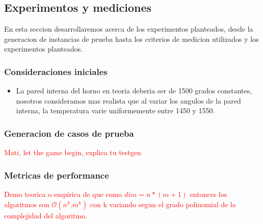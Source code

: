 \subsection{Experimentos y mediciones}
En esta seccion desarrollaremos acerca de los experimentos planteados, desde la generacion de instancias de prueba hasta los criterios de medicion utilizados y los experimentos planteados.
\subsubsection{Consideraciones iniciales}
\begin{itemize}
    \item La pared interna del horno en teoria deberia ser de 1500 grados constantes, nosotros consideramos mas realista que al variar los angulos de la pared interna, la temperatura varie uniformemente entre 1450 y 1550.
\end{itemize}

\subsubsection{Generacion de casos de prueba}
\textcolor{red}{Mati, let the game begin, explica tu testgen}

\subsubsection{Metricas de performance}
\textcolor{red}{Demo teorica o empirica de que como $dim = n*(m+1)$ entonces los algoritmos son $\mathcal{O}(n^k.m^k)$ con k variando segun el grado polinomial de la complejidad del algoritmo.}

